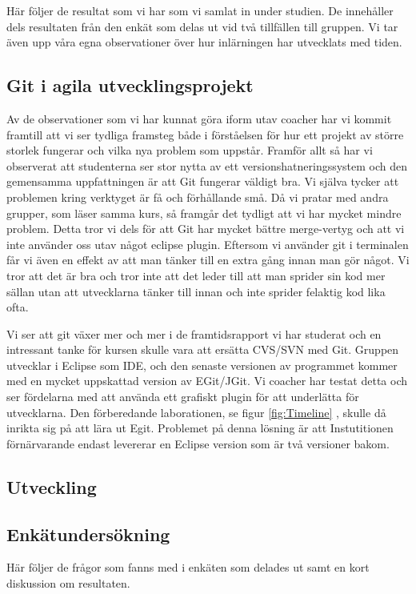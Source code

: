 Här följer de resultat som vi har som vi samlat in under studien. De innehåller dels resultaten från den enkät som delas ut vid två tillfällen till gruppen. Vi tar även upp våra egna observationer över hur inlärningen har utvecklats med tiden. 


\subsection{Git i agila utvecklingsprojekt}
Av de observationer som vi har kunnat göra iform utav coacher har vi kommit framtill att vi ser tydliga framsteg både i förståelsen för hur ett projekt av större storlek fungerar och vilka nya problem som uppstår. Framför allt så har vi observerat att studenterna ser stor nytta av ett versionshatneringssystem och den gemensamma uppfattningen är att Git fungerar väldigt bra. Vi själva tycker att problemen kring verktyget är få och förhållande små. Då vi pratar med andra grupper, som läser samma kurs, så framgår det tydligt att vi har mycket mindre problem. Detta tror vi dels för att Git har mycket bättre merge-vertyg och att vi inte använder oss utav något eclipse plugin. Eftersom vi använder git i terminalen får vi även en effekt av att man tänker till en extra gång innan man gör något. Vi tror att det är bra och tror inte att det leder till att man sprider sin kod mer sällan utan att utvecklarna tänker till innan och inte sprider felaktig kod lika ofta. 

Vi ser att git växer mer och mer i de framtidsrapport vi har studerat och en intressant tanke för kursen skulle vara att ersätta CVS/SVN med Git. Gruppen utvecklar i Eclipse som IDE, och den senaste versionen av programmet kommer med en mycket uppskattad version av EGit/JGit. Vi coacher har testat detta och ser fördelarna med att använda ett grafiskt plugin för att underlätta för utvecklarna. Den förberedande laborationen, se figur \ref{fig:Timeline} , skulle då inrikta sig på att lära ut Egit. Problemet på denna lösning är att Instutitionen förnärvarande endast levererar en Eclipse version som är två versioner bakom. 


\subsection{Utveckling}
\subsection{Enkätundersökning}

Här följer de frågor som fanns med i enkäten som delades ut samt en kort diskussion om resultaten.

